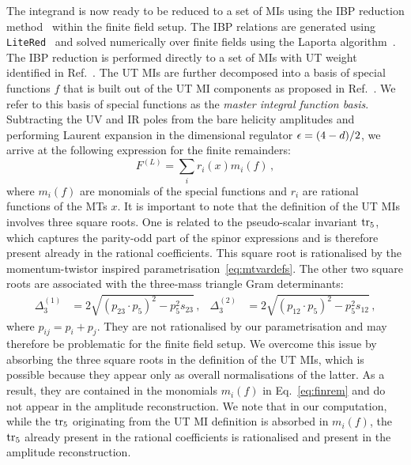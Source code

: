 \documentclass[main.tex]{subfiles}
\begin{document}
The integrand is now ready to be reduced to a set of MIs using the IBP reduction method~\cite{Chetyrkin:1981qh} within the finite field setup. The IBP relations are generated using \texttt{LiteRed}~\cite{Lee:2012cn} and solved numerically over finite fields using the Laporta algorithm~\cite{Laporta:2001dd}. The IBP reduction is performed directly to a set of MIs with UT weight identified in Ref.~\cite{Abreu:2020jxa}. The UT MIs are further decomposed into a basis of special functions $f$ that is built out of the UT MI components as proposed in Ref.~\cite{Badger:2021nhg}. We refer to this basis of special functions as the \textit{master integral function basis}.
Subtracting the UV and IR poles from the bare helicity amplitudes and performing Laurent expansion in the dimensional regulator $\epsilon = (4-d)/2$, we arrive at the following expression for the finite remainders:
\begin{equation}
F^{(L)} = \sum_{i} r_i(x) m_i(f)\,,
\label{eq:finrem}
\end{equation}
where $m_i(f)$ are monomials of the special functions and $r_i$ are rational functions of the MTs $x$. It is important to note that the definition of the UT MIs involves three square roots. One is related to the pseudo-scalar invariant $\operatorname{\rm tr}_5$, which captures the parity-odd part of the spinor expressions and is therefore present already in the rational coefficients. This square root is rationalised by the momentum-twistor inspired parametrisation~\ref{eq:mtvardefs}. The other two square roots are associated with the three-mass triangle Gram determinants:
\begin{align}
  \Delta_3^{(1)} &= 2 \sqrt{(p_{23} \cdot p_{5})^2 - p_5^2 s_{23}} \,,&
  \Delta_3^{(2)} &= 2 \sqrt{(p_{12} \cdot p_{5})^2 - p_5^2 s_{12}} \,,
  \label{eq:squareroots}
\end{align}
where $p_{ij} = p_i + p_j$.
They are not rationalised by our parametrisation and may therefore be problematic for the finite field setup. We overcome this issue by absorbing the three square roots in the definition of the UT MIs, which is possible because they appear only as overall normalisations of the latter. As a result, they are contained in the monomials $m_i(f)$ in Eq.~\ref{eq:finrem} and do not appear in the amplitude reconstruction.
We note that in our computation, while the $\operatorname{\rm tr}_5$ originating from the UT MI definition is absorbed in $m_i(f)$, 
the $\operatorname{\rm tr}_5$ already present in the rational coefficients is rationalised and present in the amplitude reconstruction.
\end{document}
